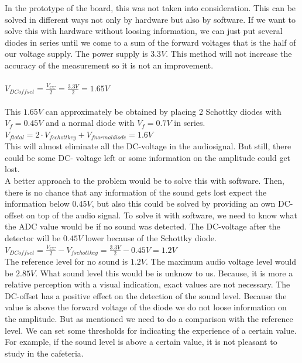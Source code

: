 \documentclass[11pt,a4paper]{article}
\begin{document}
 In the prototype of the board, this was not taken into consideration. This can be solved in different ways not only by hardware but also by software. If we want to solve this with hardware without loosing information, we can just put several diodes in series until we come to a sum of the forward voltages that is the half of our voltage supply. The power supply is $3.3 V$. This method will not increase the accuracy of the measurement so it is not an improvement. \\ \\
$V_{DC offset} = \frac{V_{CC}}{2}= \frac{3.3V}{2} = 1.65V$\\ \\
This $1.65 V$ can approximately be obtained by placing 2 Schottky diodes with $V_{f}=0.45 V$ and a normal diode with $V_{f} = 0.7 V$ in series.\\
$V_{f total} = 2\cdot V_{f schottkey} + V_{f normal diode} = 1.6 V$\\
This will almost eliminate all the DC-voltage in the audiosignal. But still, there could be some DC- voltage left or some information on the amplitude could get lost. \\
A better approach to the problem would be to solve this with software. Then, there is no chance that any information of the sound gets lost expect the information below $ 0.45 V$, but also this could be solved by providing an own DC-offset on top of the audio signal. To solve it with software, we need to know what the ADC value would be if no sound was detected. The DC-voltage after the detector will be $0.45 V$ lower because of the Schottky diode.\\
$V_{DC offset} = \frac{V_{CC}}{2}-V_{f schottkey}= \frac{3.3 V}{2}- 0.45 V = 1.2 V$ \\
The reference level for no sound is $1.2 V$. The maximum audio voltage level would be $2.85 V$. What sound level this would be is unknow to us. Because, it is more a relative perception with a visual indication, exact values are not necessary. The DC-offset has a positive effect on the detection of the sound level. Because the value is above the forward voltage of the diode we do not loose information on the amplitude. But as mentioned we need to do a comparison with the reference level. We can set some thresholds for indicating the experience of a certain value. For example, if the sound level is above a certain value, it is not pleasant to study in the cafeteria.
\end{document}
